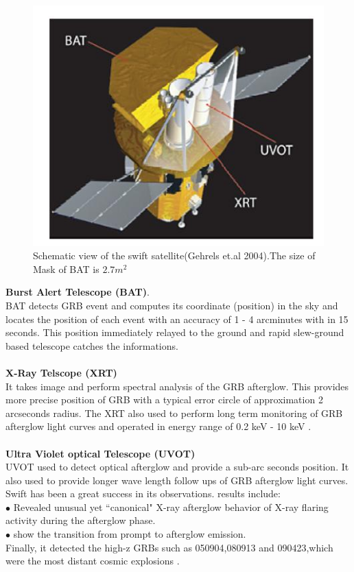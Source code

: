 \begin{figure}[h]
\begin{center}
\includegraphics[scale=0.4]{Figures/fig3.png}
\caption{Schematic view of the swift satellite(Gehrels et.al 2004).The size of Mask of BAT is $2.7m^{2}$  \citep{7}} 
\end{center}
\end{figure}
\textbf{Burst Alert Telescope (BAT)}.\\
BAT detects GRB event and computes its coordinate (position) in the sky and
locates the position of each event with an accuracy of 1 - 4 arcminutes with in 15
seconds. This position immediately relayed to the ground and rapid slew-ground
based telescope catches the informations.\\\\
\textbf{X-Ray Telscope (XRT)}\\
It takes image and perform spectral analysis of the GRB afterglow. This provides
more precise position of GRB with a typical error circle of approximation 2 arcseconds
radius. The XRT also used to perform long term monitoring of GRB afterglow light
curves and operated in energy range of 0.2 keV - 10 keV .\\\\
\textbf{ Ultra Violet optical Telescope (UVOT)}\\
UVOT used to detect optical afterglow and provide a sub-arc seconds position. It
also used to provide longer wave length follow ups of GRB afterglow light curves.
 Swift has been a great success in its observations. results include:\\
$\bullet$ Revealed unusual yet “canonical" X-ray afterglow behavior of X-ray flaring activity during the afterglow phase.\\
$\bullet$ show the transition from prompt to afterglow emission.\\
Finally, it detected the high-z GRBs such as 050904,080913 and 090423,which
were the most distant cosmic explosions \citep {5} \citep{7}.\\\\
